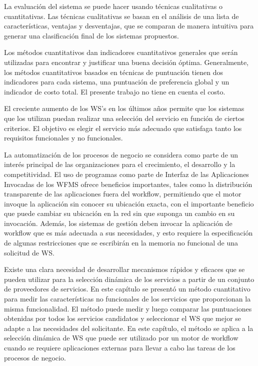 La evaluación del sistema se puede hacer usando técnicas cualitativas o cuantitativas. Las técnicas cualitativas se basan en el análisis de una lista de características, ventajas y desventajas, que se comparan de manera intuitiva para generar una clasificación final de los sistemas propuestos.
 
Los métodos cuantitativos dan indicadores cuantitativos generales que serán utilizadas para encontrar y justificar una buena decisión óptima.
Generalmente, los métodos cuantitativos basados en técnicas de puntuación tienen dos indicadores para cada sistema, una puntuación de preferencia global y un indicador de costo total. El presente trabajo no tiene en cuenta el costo.

El creciente aumento de los WS's en los últimos años permite que los sistemas que los utilizan puedan realizar una selección del servicio en función de ciertos criterios. El objetivo es elegir el servicio más adecuado que satisfaga tanto los requisitos funcionales y no funcionales.

La automatización de los procesos de negocio se considera como parte de un interés principal de las organizaciones para el crecimiento, el desarrollo y la competitividad. El uso de programas como parte de Interfaz de las Aplicaciones Invocadas de los WFMS ofrece beneficios importantes, tales como la distribución transparente de las aplicaciones fuera del workflow, permitiendo que el motor invoque la aplicación sin conocer su ubicación exacta, con el importante beneficio que puede cambiar su ubicación en la red sin que suponga un cambio en su invocación. Además, los sistemas de gestión deben invocar la aplicación de workflow que es más adecuada a sus necesidades, y esto requiere la especificación de algunas restricciones que se escribirán en la memoria no funcional de una solicitud de WS.

Existe una clara necesidad de desarrollar mecanismos rápidos y eficaces que se pueden utilizar para la selección dinámica de los servicios a partir de un conjunto de proveedores de servicios. En este capítulo se presentó un método cuantitativo para medir las características no funcionales de los servicios que proporcionan la misma funcionalidad. El método puede medir y luego comparar las puntuaciones obtenidas por todos los servicios candidatos y seleccionar el WS que mejor se adapte a las necesidades del solicitante. En este capítulo, el método se aplica a la selección dinámica de WS que puede ser utilizado por un motor de workflow cuando se requiere aplicaciones externas para llevar a cabo las tareas de los procesos de negocio. 
